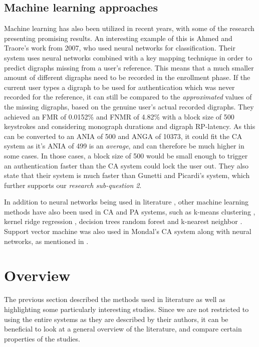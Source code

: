 \subsection{Machine learning approaches}
Machine learning has also been utilized in recent years, with some of the research presenting promising results.
An interesting example of this is Ahmed and Traore's \cite{Ahmed} work from 2007, who used neural networks for classification.
Their system uses neural networks combined with a key mapping technique in order to predict digraphs missing from a user's reference.
This means that a much smaller amount of different digraphs need to be recorded in the enrollment phase.
If the current user types a digraph to be used for authentication which was never recorded for the reference, it can still be compared to the \textit{approximated} values of the missing digraphs, based on the genuine user's actual recorded digraphs.
They achieved an FMR of 0.0152\% and FNMR of 4.82\% with a block size of 500 keystrokes and considering monograph durations and digraph RP-latency.
As this can be converted to an ANIA of 500 and ANGA of 10373, it could fit the CA system as it's ANIA of 499 is an \textit{average}, and can therefore be much higher in some cases.
In those cases, a block size of 500 would be small enough to trigger an authentication faster than the CA system could lock the user out.
They also state that their system is much faster than Gunetti and Picardi's system, which further supports our \textit{research sub-question 2}.

In addition to neural networks being used in literature \cite{Ahmed, Harun, mondal},
other machine learning methods have also been used in CA and PA systems, such as k-means clustering \cite{KIM2017, Solami}, kernel ridge regression \cite{900words}, decision trees \cite{alsultan} random forest \cite{fast} and k-nearest neighbor \cite{hu, monaco, KANG201572, stewart, Tappert}.
Support vector machine was also used in Mondal's \cite{mondal} CA system along with neural networks, as mentioned in .



\section{Overview}
\label{sec:related-overview}
The previous section described the methods used in literature as well as highlighting some particularly interesting studies.
Since we are not restricted to using the entire systems as they are described by their authors, it can be beneficial to look at a general overview of the literature, and compare certain properties of the studies.

